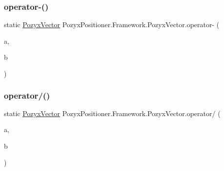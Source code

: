 \subsubsection{\texorpdfstring{operator-\/()}{operator-()}}
{\footnotesize\ttfamily static \hyperlink{struct_pozyx_positioner_1_1_framework_1_1_pozyx_vector}{Pozyx\+Vector} Pozyx\+Positioner.\+Framework.\+Pozyx\+Vector.\+operator-\/ (\begin{DoxyParamCaption}\item[{\hyperlink{struct_pozyx_positioner_1_1_framework_1_1_pozyx_vector}{Pozyx\+Vector}}]{a,  }\item[{\hyperlink{struct_pozyx_positioner_1_1_framework_1_1_pozyx_vector}{Pozyx\+Vector}}]{b }\end{DoxyParamCaption})\hspace{0.3cm}{\ttfamily [static]}}

\mbox{\label{struct_pozyx_positioner_1_1_framework_1_1_pozyx_vector_aa81e5d2b925c53e58d32833c8bca906e}} 
\subsubsection{\texorpdfstring{operator/()}{operator/()}\hspace{0.1cm}{\footnotesize\ttfamily [1/2]}}
{\footnotesize\ttfamily static \hyperlink{struct_pozyx_positioner_1_1_framework_1_1_pozyx_vector}{Pozyx\+Vector} Pozyx\+Positioner.\+Framework.\+Pozyx\+Vector.\+operator/ (\begin{DoxyParamCaption}\item[{\hyperlink{struct_pozyx_positioner_1_1_framework_1_1_pozyx_vector}{Pozyx\+Vector}}]{a,  }\item[{\hyperlink{struct_pozyx_positioner_1_1_framework_1_1_pozyx_vector}{Pozyx\+Vector}}]{b }\end{DoxyParamCaption})\hspace{0.3cm}{\ttfamily [static]}}

\mbox{\label{struct_pozyx_positioner_1_1_framework_1_1_pozyx_vector_a651734dff7c5e91459beff7ebbea3c6c}} 

